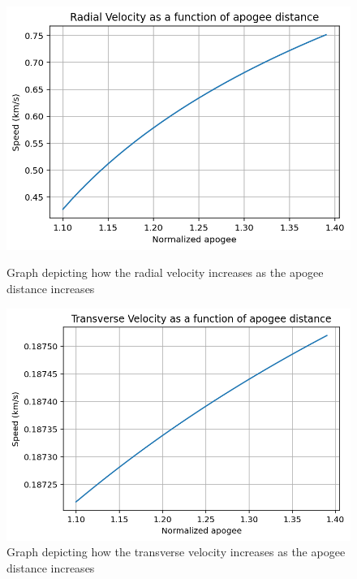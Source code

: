 \documentclass[a4paper, 12pt]{article}  %
\begin{document}
\begin{figure}[H]
    \centering
    \begin{minipage}{0.48\textwidth}
        \centering
        \includegraphics[width=\textwidth]{Images/221-rad.png}
        \caption{Graph depicting how the radial velocity increases as the apogee distance increases}
        \label{fig:pos}
    \end{minipage}
    \hfill
    \begin{minipage}{0.48\textwidth}
        \centering
        \includegraphics[width=\textwidth]{Images/221-trans.png}
        \caption{Graph depicting how the transverse velocity increases as the apogee distance increases}
        \label{fig:vel}
    \end{minipage}
\end{figure}
\end{document}
